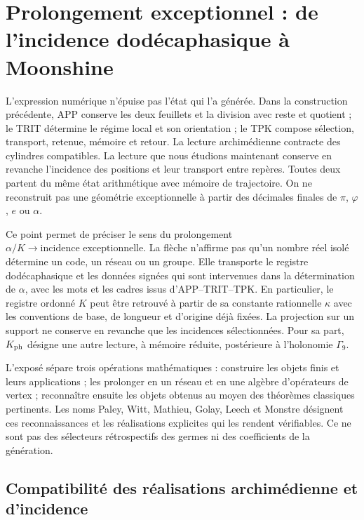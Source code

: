\section{Prolongement exceptionnel : de l'incidence dodécaphasique à Moonshine}
\label{exc:seccion}

L'expression numérique n'épuise pas l'état qui l'a générée. Dans la construction précédente, APP conserve les deux feuillets et la division avec reste et quotient ; le TRIT détermine le régime local et son orientation ; le TPK compose sélection, transport, retenue, mémoire et retour. La lecture archimédienne contracte des cylindres compatibles. La lecture que nous étudions maintenant conserve en revanche l'incidence des positions et leur transport entre repères. Toutes deux partent du même état arithmétique avec mémoire de trajectoire. On ne reconstruit pas une géométrie exceptionnelle à partir des décimales finales de $\pi$, $\varphi$, $e$ ou $\alpha$.

Ce point permet de préciser le sens du prolongement
$\alpha/K\longrightarrow\text{incidence exceptionnelle}$. La flèche
n'affirme pas qu'un nombre réel isolé détermine un code, un réseau ou un
groupe. Elle transporte le registre dodécaphasique et les données signées qui sont
intervenues dans la détermination de $\alpha$, avec les mots et les
cadres issus d'APP--TRIT--TPK. En particulier, le registre ordonné
$K$ peut être retrouvé à partir de sa constante rationnelle $\kappa$ avec les
conventions de base, de longueur et d'origine déjà fixées. La projection sur un
support ne conserve en revanche que les incidences sélectionnées.
Pour sa part, $K_{\rm ph}$
désigne une autre lecture, à mémoire réduite, postérieure à l'holonomie
$\Gamma_9$.

L'exposé sépare trois opérations mathématiques : construire les objets
finis et leurs applications ; les prolonger en un réseau et en une algèbre d'opérateurs
de vertex ; reconnaître ensuite les objets obtenus au moyen des théorèmes
classiques pertinents. Les noms Paley, Witt, Mathieu, Golay, Leech et
Monstre désignent ces reconnaissances et les réalisations explicites
qui les rendent vérifiables. Ce ne sont pas des sélecteurs rétrospectifs des
germes ni des coefficients de la génération.





\subsection{Compatibilité des réalisations archimédienne et d'incidence}
\label{exc:doble-lectura}

